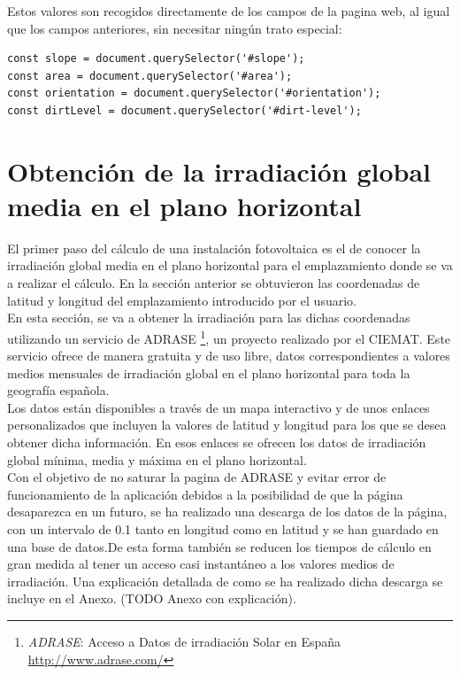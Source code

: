 \documentclass[11pt]{report}
\begin{document}
Estos valores son recogidos directamente de los campos de la pagina web, al igual que los campos anteriores, sin necesitar ningún trato especial:\\
\begin{lstlisting}[style=ES6, caption={Variables correspondientes a los campos indicados}]
const slope = document.querySelector('#slope');
const area = document.querySelector('#area');
const orientation = document.querySelector('#orientation');
const dirtLevel = document.querySelector('#dirt-level');
\end{lstlisting}

\section{Obtención de la irradiación global media en el plano horizontal}

El primer paso del cálculo de una instalación fotovoltaica es el de conocer la irradiación global media en el plano horizontal para el emplazamiento donde se va a realizar el cálculo. En la sección anterior se obtuvieron las coordenadas de latitud y longitud del emplazamiento introducido por el usuario.\\

En esta sección, se va a obtener la irradiación para las dichas coordenadas utilizando un servicio de ADRASE \footnote{\textit{ADRASE}: Acceso a Datos de irradiación Solar en España \url{http://www.adrase.com/}}, un proyecto realizado por el CIEMAT. Este servicio ofrece de manera gratuita y de uso libre, datos correspondientes a valores medios mensuales de irradiación global en el plano horizontal para toda la geografía española.\\

Los datos están disponibles a través de un mapa interactivo y de unos enlaces personalizados que incluyen la valores de latitud y longitud para los que se desea obtener dicha información. En esos enlaces se ofrecen los datos de irradiación global mínima, media y máxima en el plano horizontal.\\

Con el objetivo de no saturar la pagina de ADRASE y evitar error de funcionamiento de la aplicación debidos a la posibilidad de que la página desaparezca en un futuro, se ha realizado una descarga de los datos de la página, con un intervalo de 0.1 tanto en longitud como en latitud y se han guardado en una base de datos.De esta forma también se reducen los tiempos de cálculo en gran medida al tener un acceso casi instantáneo a los valores medios de irradiación. 
Una explicación detallada de como se ha realizado dicha descarga se incluye en el Anexo. (TODO Anexo con explicación).
\newpage
\end{document}
